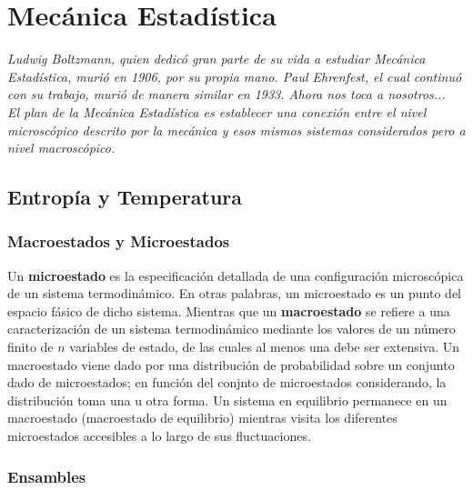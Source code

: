 \part{Mecánica Estadística}


\vspace*{\fill}

\begin{center}
	\textit{Ludwig Boltzmann, quien dedicó gran parte de su vida a estudiar Mecánica Estadística, murió en 1906, por su propia mano. Paul Ehrenfest, el cual continuó con su trabajo, murió de manera similar en 1933. Ahora nos toca a nosotros... \\
    El plan de la Mecánica Estadística es establecer una conexión entre el nivel microscópico descrito por la mecánica y esos mismos sistemas considerados pero a nivel macroscópico.}
\end{center}

\vspace*{\fill}




\chapter{Entropía y Temperatura}

\section{Macroestados y Microestados}

Un \textbf{microestado} es la especificación detallada de una configuración microscópica de un sistema termodinámico. En otras palabras, un microestado es un punto del espacio fásico de dicho sistema. Mientras que un \textbf{macroestado} se refiere a una caracterización de un sistema termodinámico mediante los valores de un número finito de $n$ variables de estado, de las cuales al menos una debe ser extensiva. Un macroestado viene dado por una distribución de probabilidad sobre un conjunto dado de microestados; en función del conjnto de microestados considerando, la distribución toma una u otra forma. Un sistema en equilibrio permanece en un macroestado (macroestado de equilibrio) mientras visita los diferentes microestados accesibles a lo largo de sus fluctuaciones.


\section{Ensambles}

